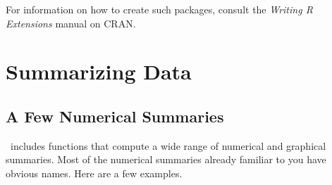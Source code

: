\begin{knitrout}
\end{knitrout}


For information on how to create such packages, consult the \textit{Writing R Extensions} manual
on CRAN.

\section{Summarizing Data}

\subsection{A Few Numerical Summaries}
\R\ includes functions that compute a wide range of numerical and graphical summaries.  
Most of the numerical summaries already familiar to you have obvious names.  
Here are a few examples.  

